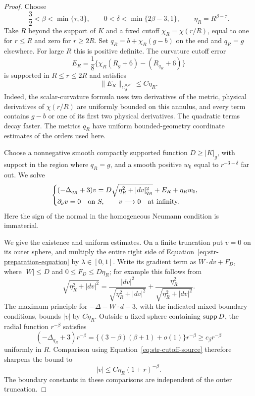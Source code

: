 \begin{proof}
Choose
\begin{equation}
 \frac32<\beta<\min\{\tau,3\},\qquad
 0<\delta<\min\{2\beta-3,1\},\qquad
 \eta_R=R^{\beta-\tau}.
 \label{eq:str-preparation-parameters}
\end{equation}
Take $R$ beyond the support of $K$ and a fixed cutoff
$\chi_R=\chi(r/R)$, equal to one for $r\leq R$ and zero for $r\geq2R$.
Set $q_R=b+\chi_R(g-b)$ on the end and $q_R=g$ elsewhere. For large
$R$ this is positive definite. The curvature cutoff error
\[
 E_R=\frac18\{\chi_R(R_g+6)-(R_{q_R}+6)\}
\]
is supported in $R\leq r\leq2R$ and satisfies
\begin{equation}
 \|E_R\|_{C^{0,\alpha'}_\beta}\leq C\eta_R.
 \label{eq:str-cutoff-source}
\end{equation}
Indeed, the scalar-curvature formula uses two derivatives of the
metric, physical derivatives of $\chi(r/R)$ are uniformly bounded on
this annulus, and every term contains $g-b$ or one of its first two
physical derivatives. The quadratic terms decay faster. The metrics
$q_R$ have uniform bounded-geometry coordinate estimates of the orders
used here.

Choose a nonnegative smooth compactly supported function $D\geq|K|_g$,
with support in the region where $q_R=g$, and a smooth positive $w_0$
equal to $r^{-3-\delta}$ far out. We solve
\begin{equation}
 \begin{cases}
 (-\Delta_{q_R}+3)v
 =D\sqrt{\eta_R^2+|dv|_{q_R}^2}+E_R+\eta_Rw_0,\\
 \partial_\nu v=0\quad\hbox{on }S,\qquad v\longrightarrow0
 \quad\hbox{at infinity}.
 \end{cases}
 \label{eq:str-preparation-equation}
\end{equation}
Here the sign of the normal in the homogeneous Neumann condition is
immaterial.

We give the existence and uniform estimates. On a finite truncation
put $v=0$ on its outer sphere, and multiply the entire right side of
Equation~\eqref{eq:str-preparation-equation} by $\lambda\in[0,1]$.
Write its gradient term as $W\cdot dv+F_D$, where $|W|\leq D$ and
$0\leq F_D\leq D\eta_R$; for example this follows from
\[
 \sqrt{\eta_R^2+|dv|^2}
 =\frac{|dv|^2}{\sqrt{\eta_R^2+|dv|^2}}
   +\frac{\eta_R^2}{\sqrt{\eta_R^2+|dv|^2}}.
\]
The maximum principle for $-\Delta-W\cdot d+3$, with the indicated
mixed boundary conditions, bounds $|v|$ by $C\eta_R$. Outside a fixed
sphere containing $\operatorname{supp} D$, the radial function $r^{-\beta}$ satisfies
\[
 (-\Delta_{q_R}+3)r^{-\beta}
 =\{(3-\beta)(\beta+1)+o(1)\}r^{-\beta}
 \geq c_\beta r^{-\beta}
\]
uniformly in $R$. Comparison using Equation~\eqref{eq:str-cutoff-source}
therefore sharpens the bound to
\begin{equation}
 |v|\leq C\eta_R(1+r)^{-\beta}.
 \label{eq:str-v-height}
\end{equation}
The boundary constants in these comparisons are independent of the
outer truncation.


\end{proof}
